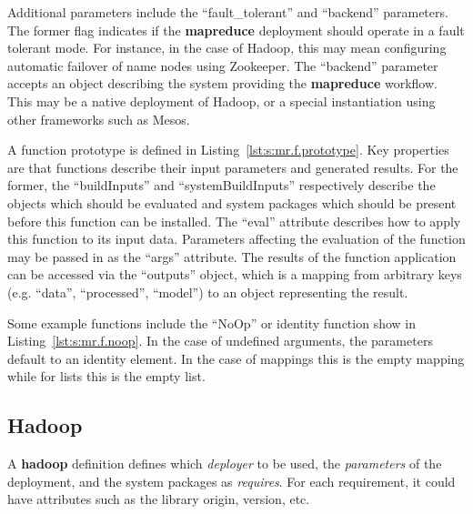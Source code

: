 \documentclass[9pt,twocolumn,twoside]{styles/osajnl}
\begin{document}

Additional parameters include the ``fault\_tolerant'' and ``backend''
parameters.  The former flag indicates if the \textbf{mapreduce}
deployment should operate in a fault tolerant mode. For instance, in
the case of Hadoop, this may mean configuring automatic failover of
name nodes using Zookeeper.  The ``backend'' parameter accepts an
object describing the system providing the \textbf{mapreduce}
workflow.  This may be a native deployment of Hadoop, or a special
instantiation using other frameworks such as Mesos.

A function prototype is defined in Listing~\ref{lst:s:mr.f.prototype}.
Key properties are that functions describe their input parameters and
generated results. For the former, the ``buildInputs'' and
``systemBuildInputs'' respectively describe the objects which should
be evaluated and system packages which should be present before this
function can be installed. The ``eval'' attribute describes how to
apply this function to its input data. Parameters affecting the
evaluation of the function may be passed in as the ``args'' attribute.
The results of the function application can be accessed via the
``outputs'' object, which is a mapping from arbitrary keys
(e.g. ``data'', ``processed'', ``model'') to an object representing
the result.



Some example functions include the ``NoOp'' or identity function show
in Listing~\ref{lst:s:mr.f.noop}.  In the case of undefined arguments,
the parameters default to an identity element. In the case of mappings
this is the empty mapping while for lists this is the empty list.



\subsection{Hadoop}

A \textbf{hadoop} definition defines which \textit{deployer} to be used,
the \textit{parameters} of the deployment, and the system packages as
\textit{requires}. For each requirement, it could have attributes such
as the library origin, version, etc.

\end{document}
